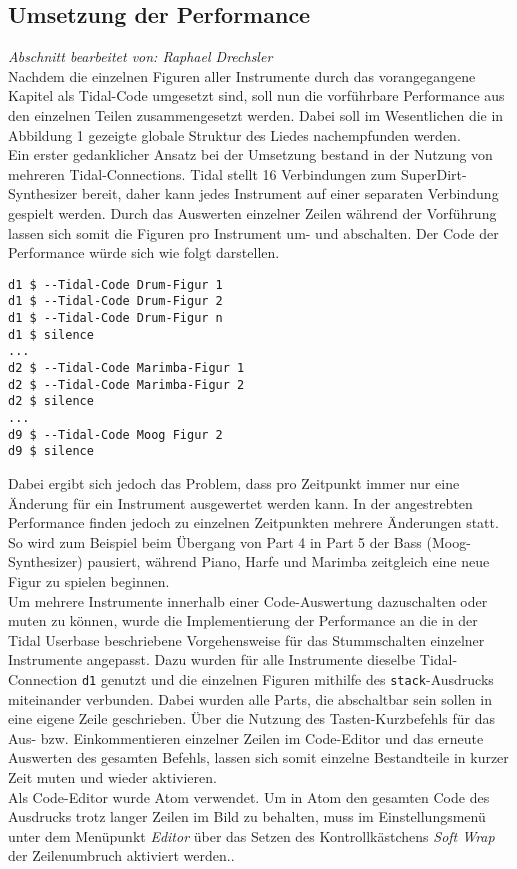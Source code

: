 \documentclass[
10pt, %
a4paper, %
oneside, %
headinclude,footinclude, %
BCOR5mm, %
]{scrartcl}
\begin{document}
\subsection{Umsetzung der Performance}
\textit{Abschnitt bearbeitet von: Raphael Drechsler}\\

\noindent Nachdem die einzelnen Figuren aller Instrumente durch das vorangegangene Kapitel als Tidal-Code umgesetzt sind, soll nun die vorführbare Performance aus den einzelnen Teilen zusammengesetzt werden. Dabei soll im Wesentlichen die in Abbildung 1 gezeigte globale Struktur des Liedes nachempfunden werden.\\
Ein erster gedanklicher Ansatz bei der Umsetzung bestand in der Nutzung von mehreren Tidal-Connections. Tidal stellt 16 Verbindungen zum SuperDirt-Synthesizer bereit\cite{tid14}, daher kann jedes Instrument auf einer separaten Verbindung gespielt werden. Durch das Auswerten einzelner Zeilen während der Vorführung lassen sich somit die Figuren pro Instrument um- und abschalten. Der Code der Performance würde sich wie folgt darstellen.

\begin{lstlisting}
d1 $ --Tidal-Code Drum-Figur 1
d1 $ --Tidal-Code Drum-Figur 2
d1 $ --Tidal-Code Drum-Figur n
d1 $ silence
...
d2 $ --Tidal-Code Marimba-Figur 1
d2 $ --Tidal-Code Marimba-Figur 2
d2 $ silence
...
d9 $ --Tidal-Code Moog Figur 2
d9 $ silence
\end{lstlisting}

\noindent Dabei ergibt sich jedoch das Problem, dass pro Zeitpunkt immer nur eine Änderung für ein Instrument ausgewertet werden kann. In der angestrebten Performance finden jedoch zu einzelnen Zeitpunkten mehrere Änderungen statt. So wird zum Beispiel beim Übergang von Part 4 in Part 5 der Bass (Moog-Synthesizer) pausiert, während Piano, Harfe und Marimba zeitgleich eine neue Figur zu spielen beginnen.\\

\noindent Um mehrere Instrumente innerhalb einer Code-Auswertung dazuschalten oder muten zu können, wurde die Implementierung der Performance an die in der Tidal Userbase beschriebene Vorgehensweise für das Stummschalten einzelner Instrumente angepasst.\cite{tid13} Dazu wurden für alle Instrumente dieselbe Tidal-Connection \verb|d1| genutzt und die einzelnen Figuren mithilfe des \verb|stack|-Ausdrucks miteinander verbunden. Dabei wurden alle Parts, die abschaltbar sein sollen in eine eigene Zeile geschrieben. Über die Nutzung des Tasten-Kurzbefehls für das Aus- bzw. Einkommentieren einzelner Zeilen im Code-Editor und das erneute Auswerten des gesamten Befehls, lassen sich somit einzelne Bestandteile in kurzer Zeit muten und wieder aktivieren.\\
Als Code-Editor wurde Atom verwendet. Um in Atom den gesamten Code des Ausdrucks trotz langer Zeilen im Bild zu behalten, muss im Einstellungsmenü unter dem Menüpunkt \textit{Editor} über das Setzen des Kontrollkästchens \textit{Soft Wrap} der Zeilenumbruch aktiviert werden.\cite{atom1}. \\
\end{document}
